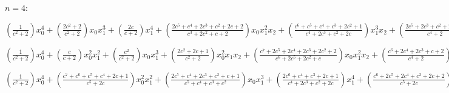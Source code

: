 \documentclass{article}
\numberwithin{equation}{section}
\begin{document}
$n=4$:

       	
$(\frac{1}{c^{2} + 2}) x_{0}^{4} + (\frac{2 c^{2} + 2}{c^{2} + 2})
x_{0} x_{1}^{3} + (\frac{2 c}{c + 2}) x_{1}^{4} + (\frac{2 c^{5} + c^{4}
+ 2 c^{3} + c^{2} + 2 c + 2}{c^{3} + 2 c^{2} + c + 2}) x_{0} x_{1}^{2}
x_{2} + (\frac{c^{6} + c^{5} + c^{4} + c^{3} + 2 c^{2} + 1}{c^{4} + 2
c^{3} + c^{2} + 2 c}) x_{1}^{3} x_{2} + (\frac{2 c^{5} + 2 c^{3} + c^{2}
+ 2 c + 1}{c^{4} + 2}) x_{0} x_{1} x_{2}^{2} + (\frac{c^{4} + 2 c^{3} +
2 c^{2}}{c^{2} + 2}) x_{1}^{2} x_{2}^{2} + (\frac{2 c^{2} + 2}{c^{2} +
2}) x_{0} x_{2}^{3} + (\frac{2 c^{7} + c^{4} + 2 c^{3} + 2 c^{2} + 2 c +
2}{c^{5} + 2 c}) x_{1} x_{2}^{3} + (\frac{2 c}{c + 2}) x_{2}^{4}$               

$(\frac{1}{c^{2} + 2}) x_{0}^{4} + (\frac{c}{c + 2}) x_{0}^{2} x_{1}^{2}
+ (\frac{c^{2}}{c^{2} + 2}) x_{0} x_{1}^{3} + (\frac{2 c^{2} + 2 c +
1}{c^{2} + 2}) x_{0}^{2} x_{1} x_{2} + (\frac{c^{7} + 2 c^{5} + 2 c^{4}
+ 2 c^{3} + 2 c^{2} + 2}{c^{6} + 2 c^{5} + 2 c^{2} + c}) x_{0} x_{1}^{2}
x_{2} + (\frac{c^{6} + 2 c^{4} + 2 c^{3} + c + 2}{c^{4} + 2}) x_{1}^{3}
x_{2} + (\frac{2 c^{2} + 2 c + 1}{c^{2} + 2}) x_{0}^{2} x_{2}^{2} +
(\frac{c^{6} + 2 c^{5} + 2 c^{4} + 2 c^{3} + 2 c + 1}{c^{6} + 2 c^{5} +
2 c^{2} + c}) x_{0} x_{1} x_{2}^{2} + (\frac{2 c^{7} + c^{6} + 2 c^{5} +
c^{4} + c^{3} + 1}{c^{5} + 2 c}) x_{1}^{2} x_{2}^{2} + (\frac{2 c^{6} +
2 c^{4} + 2 c^{2} + c + 2}{c^{4} + c^{2}}) x_{0} x_{2}^{3} +
(\frac{c^{6} + c^{5} + 2 c^{4} + c^{2} + c + 2}{c^{4} + c^{3} + c^{2} +
c}) x_{1} x_{2}^{3} + (\frac{c^{6} + c^{5} + c^{3} + c^{2} + 2 c +
1}{c^{5} + 2 c^{4} + c^{3} + 2 c^{2}}) x_{2}^{4}$               

$ (\frac{1}{c^{2} + 2})
x_{0}^{4} + (\frac{c^{7} + c^{6} + c^{5} + c^{4} + 2 c + 1}{c^{5} + 2
c}) x_{0}^{2} x_{1}^{2} + (\frac{2 c^{7} + c^{4} + 2 c^{3} + c^{2} + c +
1}{c^{5} + c^{4} + c^{3} + c^{2}}) x_{0} x_{1}^{3} + (\frac{2 c^{6} +
c^{4} + c^{3} + 2 c + 1}{c^{4} + 2 c^{3} + c^{2} + 2 c}) x_{1}^{4} +
(\frac{c^{6} + 2 c^{5} + 2 c^{4} + c^{2} + 2 c + 2}{c^{5} + 2 c})
x_{0}^{2} x_{1} x_{2} + (\frac{2 c^{7} + c^{5} + c^{3} + 1}{c^{5} +
c^{4} + 2 c^{3} + c^{2} + c}) x_{0} x_{1}^{2} x_{2} + (\frac{c^{5} + 2
c^{3} + c^{2} + c + 1}{c^{3} + c^{2}}) x_{1}^{3} x_{2} + (\frac{c}{c +
2}) x_{0}^{2} x_{2}^{2} + (\frac{2 c^{7} + 2 c^{4} + c^{3} + c^{2} +
1}{c^{5} + c^{4} + 2 c^{3} + c^{2} + c}) x_{0} x_{1} x_{2}^{2} +
(\frac{2 c^{7} + c^{6} + 2 c^{5} + c^{4} + c^{3} + 1}{c^{5} + 2 c})
x_{1}^{2} x_{2}^{2} + (\frac{c^{2}}{c^{2} + 2}) x_{0} x_{2}^{3} +
(\frac{2 c^{6} + 2 c^{5} + 2 c^{3} + 2 c^{2} + c + 2}{c^{5} + 2 c})
x_{1} x_{2}^{3}$
\end{document}
